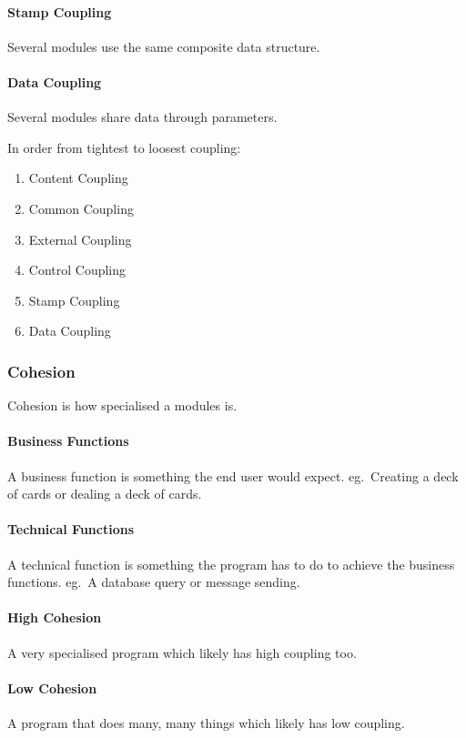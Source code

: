 \paragraph{Stamp Coupling}\label{par:stamp_coupling}

Several modules use the same composite data structure.

\paragraph{Data Coupling}\label{par:data_coupling}

Several modules share data through parameters.

\noindent
In order from tightest to loosest coupling:

\begin{enumerate}
	\item Content Coupling
	\item Common Coupling
	\item External Coupling
	\item Control Coupling
	\item Stamp Coupling
	\item Data Coupling
\end{enumerate}

\subsubsection{Cohesion}\label{ssub:cohesion}

Cohesion is how specialised a modules is.

\paragraph{Business Functions}\label{par:business_functions}

A business function is something the end user would expect. eg.\ Creating a deck of cards or dealing a deck of cards.

\paragraph{Technical Functions}\label{par:technical_fucntions}

A technical function is something the program has to do to achieve the business functions. eg.\ A database query or message sending.

\paragraph{High Cohesion}\label{par:high_cohesion}

A very specialised program which likely has high coupling too.

\paragraph{Low Cohesion}\label{par:low_cohesion}

A program that does many, many things which likely has low coupling.
